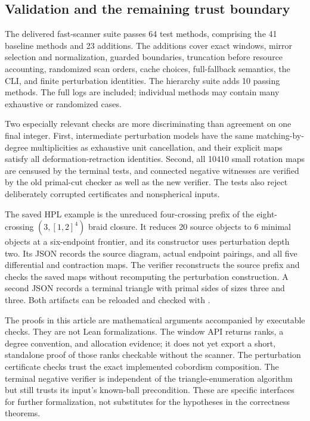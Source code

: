 \subsection{Validation and the remaining trust boundary}

The delivered fast-scanner suite passes 64 test methods, comprising the
41 baseline methods and 23 additions.  The additions cover exact windows,
mirror selection and normalization, guarded boundaries, truncation before
resource accounting, randomized scan orders, cache choices, full-fallback
semantics, the CLI, and finite perturbation identities.  The hierarchy
suite adds 10 passing methods.  The full logs are included; individual
methods may contain many exhaustive or randomized cases.

Two especially relevant checks are more discriminating than agreement on
one final integer.  First, intermediate perturbation models have the same
matching-by-degree multiplicities as exhaustive unit cancellation, and
their explicit maps satisfy all deformation-retraction identities.
Second, all 10410 small rotation maps are censused by the terminal tests,
and connected negative witnesses are verified by the old primal-cut
checker as well as the new verifier.  The tests also reject deliberately
corrupted certificates and nonspherical inputs.

The saved HPL example is the unreduced four-crossing prefix of the
eight-crossing $(3,[1,2]^4)$ braid closure.  It reduces 20 source objects
to 6 minimal objects at a six-endpoint frontier, and its constructor
uses perturbation depth two.  Its JSON records the source diagram,
actual endpoint pairings, and all five differential and contraction
maps.  The verifier reconstructs the source prefix and checks the saved
maps without recomputing the perturbation construction.  A second JSON
records a terminal triangle with primal sides of sizes three and three.
Both artifacts can be reloaded and checked with
.

The proofs in this article are mathematical arguments accompanied by
executable checks.  They are not Lean formalizations.  The window API
returns ranks, a degree convention, and allocation evidence; it does not
yet export a short, standalone proof of those ranks checkable without the
scanner.  The perturbation certificate checks trust the exact implemented
cobordism composition.  The terminal negative verifier is independent of
the triangle-enumeration algorithm but still trusts its input's known-ball
precondition.  These are specific interfaces for further formalization,
not substitutes for the hypotheses in the correctness theorems.

